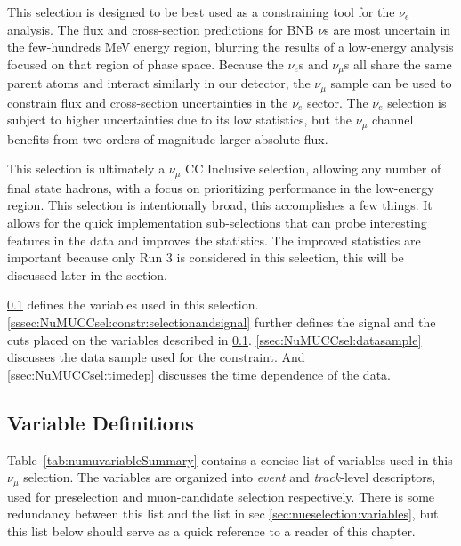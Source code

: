 \label{sec:NuMUCCsel}

\par This selection is designed to be best used as a constraining tool for the $\nu_e$ analysis. The flux and cross-section predictions for BNB $\nu$s are most uncertain in the few-hundreds MeV energy region, blurring the results of a low-energy analysis focused on that region of phase space. Because the $\nu_e$s and $\nu_{\mu}$s all share the same parent atoms and interact similarly in our detector, the $\nu_{\mu}$ sample can be used to constrain flux and cross-section uncertainties in the $\nu_e$ sector. The $\nu_{e}$ selection is subject to higher uncertainties due to its low statistics, but the $\nu_{\mu}$ channel benefits from two orders-of-magnitude larger absolute flux.

\par This selection is ultimately a $\nu_{\mu}$ CC Inclusive selection, allowing any number of final state hadrons, with a focus on prioritizing performance in the low-energy region. This selection is intentionally broad, this accomplishes a few things. It allows for the quick implementation sub-selections that can probe interesting features in the data and improves the statistics. The improved statistics are important because only Run 3 is considered in this selection, this will be discussed later in the section. 

\par \cref{ssec:NuMUCCsel:sel:vars} defines the variables used in this selection. \cref{sssec:NuMUCCsel:constr:selectionandsignal} further defines the signal and the cuts placed on the variables described in \cref{ssec:NuMUCCsel:sel:vars}. \cref{ssec:NuMUCCsel:datasample} discusses the data sample used for the constraint. And \cref{ssec:NuMUCCsel:timedep} discusses the time dependence of the data.

\subsection{Variable Definitions}
\label{ssec:NuMUCCsel:sel:vars}

\par Table~\ref{tab:numuvariableSummary} contains a concise list of variables used in this $\nu_{\mu}$ selection. The variables are organized into \textit{event} and \textit{track}-level descriptors, used for preselection and muon-candidate selection respectively. There is some redundancy between this list and the list in sec \ref{sec:nueselection:variables}, but this list below should serve as a quick reference to a reader of this chapter.

